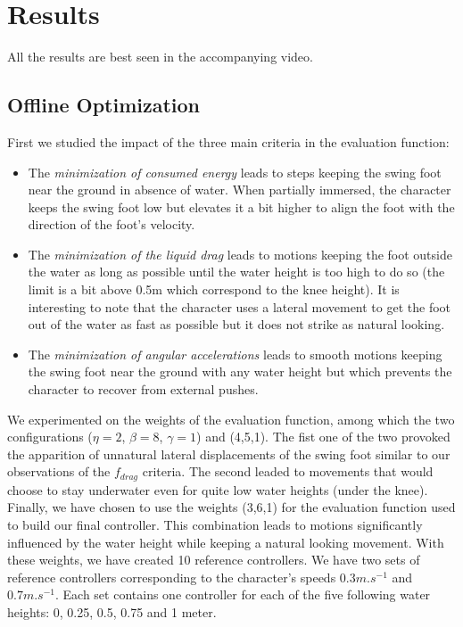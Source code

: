 \documentclass[conference]{acmsiggraph}
\begin{document}
\section{Results}
\label{sec:results}

All the results are best seen in the accompanying video.

\subsection{Offline Optimization}
First we studied the impact of the three main criteria in the evaluation function:
\begin{itemize}
\item\begin{minipage}[t]{\linewidth}{
The \textit{minimization of consumed energy} leads to steps keeping the swing foot near the ground in absence of water. When partially immersed, the character keeps the swing foot low but elevates it a bit higher to align the foot with the direction of the foot's velocity.}
\end{minipage}
\item\begin{minipage}[t]{\linewidth}{
The \textit{minimization of the liquid drag} leads to motions keeping the foot outside the water as long as possible until the water height is too high to do so (the limit is a bit above 0.5m which correspond to the knee height). It is interesting to note that the character uses a lateral movement to get the foot out of the water as fast as possible but it does not strike as natural looking.}
\end{minipage}
\item\begin{minipage}[t]{\linewidth}{
The \textit{minimization of angular accelerations} leads to smooth motions keeping the swing foot near the ground with any water height but which prevents the character to recover from external pushes.}
\end{minipage}
\end{itemize}
We experimented on the weights of the evaluation function, among which the two configurations ($\eta=2$, $\beta=8$, $\gamma=1$) and (4,5,1). The fist one of the two provoked the apparition of unnatural lateral displacements of the swing foot similar to our observations of the $f_{drag}$ criteria. The second leaded to movements that would choose to stay underwater even for quite low water heights (under the knee). Finally, we have chosen to use the weights (3,6,1) for the evaluation function used to build our final controller. This combination leads to motions significantly influenced by the water height while keeping a natural looking movement. With these weights, we have created 10 reference controllers. We have two sets of reference controllers corresponding to the character's speeds $0.3m.s^{-1}$ and $0.7m.s^{-1}$. Each set contains one controller for each of the five following water heights: 0, 0.25, 0.5, 0.75 and 1 meter.
\end{document}
